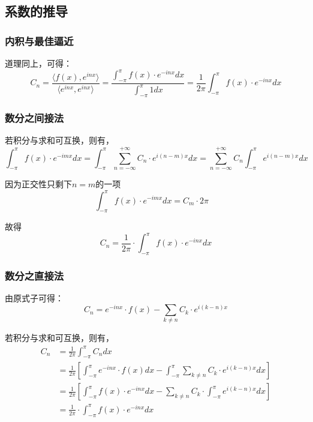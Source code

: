 \documentclass[12pt,a4paper]{article}
\numberwithin{subsection}{section}   %
\numberwithin{subsubsection}{subsection}
\theoremstyle{plain}
\theoremstyle{definition}
\theoremstyle{remark}
\theoremstyle{remark}
\begin{document}
\subsection{系数的推导}

\subsubsection{内积与最佳逼近}
道理同上，可得：
\begin{equation}
 C_n = \frac{\langle f(x), e^{inx} \rangle}{\langle e^{inx}, e^{inx} \rangle} = \frac{\int_{-\pi}^{\pi} f(x) \cdot e^{-inx} dx}{\int_{-\pi}^{\pi} 1 dx} = \frac{1}{2\pi} \int_{-\pi}^{\pi} f(x) \cdot e^{-inx} dx
\end{equation}

\subsubsection{数分之间接法}
若积分与求和可互换，则有，
\begin{equation}
	\int_{-\pi}^{\pi} f(x) \cdot e^{-imx} dx = \int_{-\pi}^{\pi} \sum_{n=-\infty}^{+\infty} C_n \cdot e^{i(n-m)x} dx = \sum_{n=-\infty}^{+\infty} C_n \int_{-\pi}^{\pi} e^{i(n-m)x} dx
\end{equation}

因为正交性只剩下$n=m$的一项
\begin{equation}
	 \int_{-\pi}^{\pi} f(x) \cdot e^{-imx} dx = C_m \cdot 2\pi \quad  
\end{equation}

故得
\begin{equation}
C_n = \frac{1}{2\pi} \cdot \int_{-\pi}^{\pi} f(x) \cdot e^{-inx} dx
\end{equation}

\subsubsection{数分之直接法}
由原式子可得：
\begin{equation}
C_n =e^{-inx} \cdot f(x)-\sum_{k \neq n} C_k \cdot e^{i(k-n)x}
\end{equation}

若积分与求和可互换，则有，
\begin{equation}
	\begin{aligned}
		C_n &= \frac{1}{2\pi} \int_{-\pi}^{\pi} C_n dx \\
		&= \frac{1}{2\pi} \left[ \int_{-\pi}^{\pi} e^{-inx} \cdot f(x) dx - \int_{-\pi}^{\pi} \sum_{k \neq n} C_k \cdot e^{i(k-n)x} dx \right] \\[8pt]
		&= \frac{1}{2\pi} \left[ \int_{-\pi}^{\pi} f(x) \cdot e^{-inx} dx - \sum_{k \neq n} C_k \cdot \int_{-\pi}^{\pi} e^{i(k-n)x} dx \right] \\[8pt]
		&= \frac{1}{2\pi} \cdot \int_{-\pi}^{\pi} f(x) \cdot e^{-inx} dx
	\end{aligned}
\end{equation}
\end{document}
